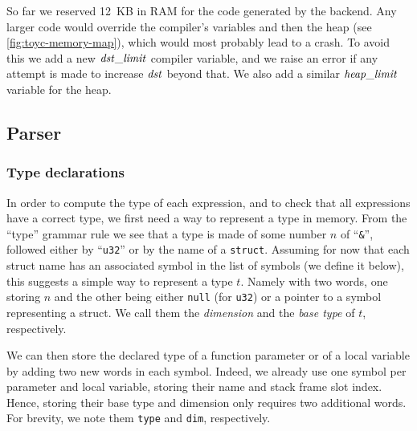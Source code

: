 So far we reserved 12~KB in RAM for the code generated by the backend. Any
larger code would override the compiler's variables and then the heap (see
\cref{fig:toyc-memory-map}), which would most probably lead to a crash. To
avoid this we add a new $\it{dst\_limit}$ compiler variable, and we raise an
error if any attempt is made to increase $\it{dst}$ beyond that. We also add a
similar $\it{heap\_limit}$ variable for the heap.

\subsection{Parser}

\subsubsection{Type declarations}

In order to compute the type of each expression, and to check that all
expressions have a correct type, we first need a way to represent a type in
memory. From the ``type'' grammar rule we see that a type is made of some
number $n$ of ``{\tt \&}'', followed either by ``{\tt u32}'' or by the name of
a {\tt struct}. Assuming for now that each struct name has an associated symbol
in the list of symbols (we define it below), this suggests a simple way to
represent a type $t$. Namely with two words, one storing $n$ and the other
being either {\tt null} (for {\tt u32}) or a pointer to a symbol representing a
struct. We call them the {\em dimension} and the {\em base type} of $t$,
respectively.

We can then store the declared type of a function parameter or of a local
variable by adding two new words in each symbol. Indeed, we already use one
symbol per parameter and local variable, storing their name and stack frame
slot index. Hence, storing their base type and dimension only requires two
additional words. For brevity, we note them {\tt type} and {\tt dim},
respectively.

